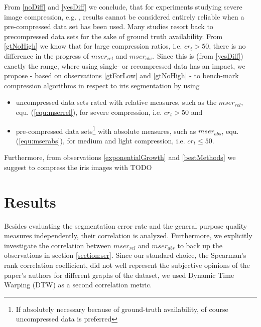 \documentclass[10pt,twocolumn,letterpaper]{article}
\begin{document}
From \ref{noDiff} and \ref{yesDiff} we conclude, that for experiments studying severe image compression, e.g. \cite{BDaugman08a, severeCompression}, results cannot be considered entirely reliable when a pre-compressed data set has been used. Many studies resort back to precompressed data sets for the sake of ground truth availability. From \ref{gtNoHigh} we know that for large compression ratios, i.e. $cr_t > 50$, there is no difference in the progress of $mser_{rel}$ and $mser_{abs}$. Since this is (from \ref{yesDiff}) exactly the range, where using single- or recompressed data has an impact, we propose - based on observations \ref{gtForLow} and \ref{gtNoHigh} - to bench-mark compression algorithms in respect to iris segmentation by using 
\begin{itemize}
	\item uncompressed data sets rated with relative measures, such as the $mser_{rel}$, equ. (\ref{equ:mserrel}), for severe compression, i.e. $cr_t > 50$ and
	\item pre-compressed data sets\footnote{If absolutely necessary because of ground-truth availability, of course uncompressed data is preferred} with absolute measures, such as $mser_{abs}$, equ. (\ref{equ:mserabs}), for medium and light compression, i.e. $cr_t \leq 50$.
\end{itemize}
Furthermore, from observations \ref{exponentialGrowth} and \ref{bestMethods} we suggest to compress the iris images with TODO





\section{Results}
\label{section:results}
Besides evaluating the segmentation error rate and the general purpose quality measures independently, their correlation is analyzed. Furthermore, we explicitly investigate the correlation between $mser_{rel}$ and $mser_{abs}$ to back up the observations in section \ref{section:ser}.
Since our standard choice, the Spearman’s rank correlation coefficient, did not well represent the subjective opinions of the paper’s authors for different graphs of the dataset, we used Dynamic Time Warping (DTW) as a second correlation metric.
\end{document}
